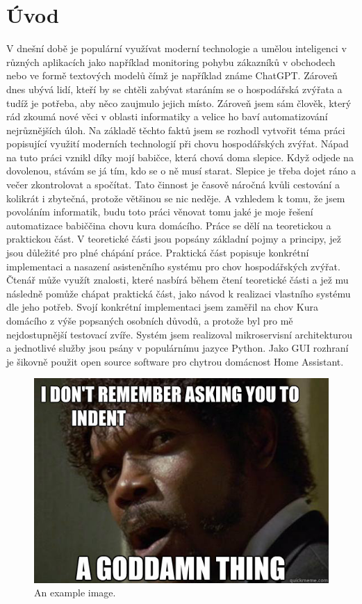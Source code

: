 \usepackage{graphicx}
\chapter{Úvod}
V dnešní době je populární využívat moderní technologie a umělou inteligenci v různých aplikacích jako například monitoring pohybu zákazníků v obchodech nebo ve formě textových modelů čímž je například známe ChatGPT. Zároveň dnes ubývá lidí, kteří by se chtěli zabývat staráním se o hospodářská zvýřata a tudíž je potřeba, aby něco zaujmulo jejich místo. Zároveň jsem sám člověk, který rád zkoumá nové věci v oblasti informatiky a velice ho baví automatizování nejrůznějších úloh. Na základě těchto faktů jsem se rozhodl vytvořit téma práci popisující využití moderních technologií při chovu hospodářských zvýřat. Nápad na tuto práci vznikl díky mojí babičce, která chová doma slepice. Když odjede na dovolenou, stávám se já tím, kdo se o ně musí starat. Slepice je třeba dojet ráno a večer zkontrolovat a spočítat. Tato činnost je časově náročná kvůli cestování a kolikrát i zbytečná, protože většinou se nic neděje. A vzhledem k tomu, že jsem povoláním informatik, budu toto práci věnovat tomu jaké je moje řešení automatizace babiččina chovu kura domácího.
\newline
Práce se dělí na teoretickou a praktickou část. V teoretické části jsou popsány základní pojmy a principy, jež jsou důležité pro plné chápání práce. Praktická část popisuje konkrétní implementaci a nasazení asistenčního systému pro chov hospodářských zvýřat. Čtenář může využít znalosti, které nasbírá během čtení teoretické části a jež mu následně pomůže chápat praktická část, jako návod k realizaci vlastního systému dle jeho potřeb.
\newline
Svojí konkrétní implementaci jsem zaměřil na chov Kura domácího z výše popsaných osobních důvodů, a protože byl pro mě nejdostupnější testovací zvíře. Systém jsem realizoval mikroservisní architekturou a jednotlivé služby jsou psány v populárnímu jazyce Python. Jako GUI rozhraní je šikovně použit open source software pro chytrou domácnost Home Assistant.
\newline

\begin{figure}[h!]
    \centering
    \includegraphics{./img/pulp}
    \caption{An example image.}
    \label{fig:example}
\end{figure}